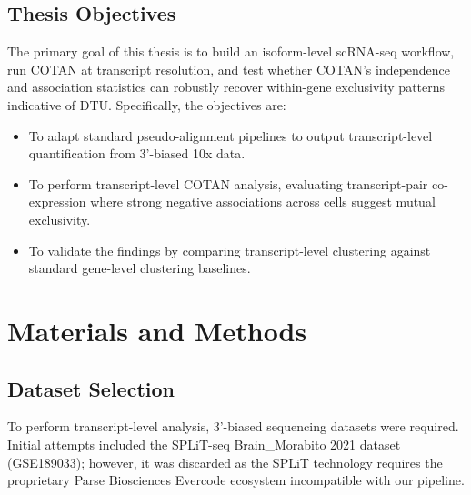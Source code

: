 \section{Thesis Objectives}
The primary goal of this thesis is to build an isoform-level scRNA-seq workflow, run COTAN at transcript resolution, and test whether COTAN's independence and association statistics can robustly recover within-gene exclusivity patterns indicative of DTU. 
Specifically, the objectives are:
\begin{itemize}
    \item To adapt standard pseudo-alignment pipelines to output transcript-level quantification from 3'-biased 10x data.
    \item To perform transcript-level COTAN analysis, evaluating transcript-pair co-expression where strong negative associations across cells suggest mutual exclusivity.
    \item To validate the findings by comparing transcript-level clustering against standard gene-level clustering baselines.
\end{itemize}

\chapter{Materials and Methods}

\section{Dataset Selection}
To perform transcript-level analysis, 3'-biased sequencing datasets were required. Initial attempts included the SPLiT-seq Brain\_Morabito 2021 dataset (GSE189033); however, it was discarded as the SPLiT technology requires the proprietary Parse Biosciences Evercode ecosystem incompatible with our pipeline.

